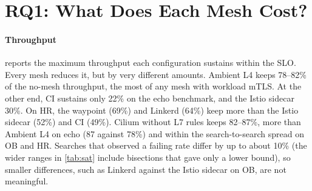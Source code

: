
\section{RQ1: What Does Each Mesh Cost?}
\label{sec:rq1}

\paragraph{Throughput}
 reports the maximum throughput each configuration sustains
within the SLO. Every mesh reduces it, but by very different amounts. Ambient
L4 keeps 78--82\% of the no-mesh throughput, the most of any mesh with workload
mTLS. At the other end, CI sustains only 22\% on the echo benchmark, and
the Istio sidecar 30\%. On HR, the waypoint (69\%) and Linkerd (64\%)
keep more than the Istio sidecar (52\%) and CI (49\%). Cilium without L7
rules keeps 82--87\%, more than Ambient L4 on echo (87 against 78\%) and
within the search-to-search spread on OB and HR. Searches that observed a
failing rate differ by up to about 10\% (the wider ranges in \cref{tab:sat}
include bisections that gave only a lower bound), so smaller differences,
such as Linkerd against the Istio sidecar on OB, are not meaningful.

\begin{table}[t]
  \centering
  \caption{Maximum SLO-compliant throughput (req/s) and fraction of the
           no-mesh baseline: median of the searches whose boundary was
           observed, with the range over all searches of the cell (2--3
           searches, \cref{sec:load}).}
  \label{tab:sat}
  \footnotesize
  \setlength{\tabcolsep}{3pt}
  
\end{table}


